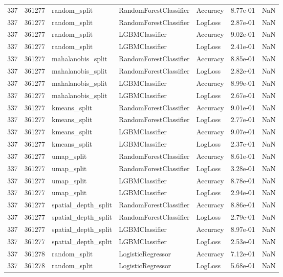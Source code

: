 \begin{tabular}{rrlllrr}
337 & 361277 & random\_split & RandomForestClassifier & Accuracy & 8.77e-01 & NaN \\
337 & 361277 & random\_split & RandomForestClassifier & LogLoss & 2.87e-01 & NaN \\
337 & 361277 & random\_split & LGBMClassifier & Accuracy & 9.02e-01 & NaN \\
337 & 361277 & random\_split & LGBMClassifier & LogLoss & 2.41e-01 & NaN \\
337 & 361277 & mahalanobis\_split & RandomForestClassifier & Accuracy & 8.85e-01 & NaN \\
337 & 361277 & mahalanobis\_split & RandomForestClassifier & LogLoss & 2.82e-01 & NaN \\
337 & 361277 & mahalanobis\_split & LGBMClassifier & Accuracy & 8.99e-01 & NaN \\
337 & 361277 & mahalanobis\_split & LGBMClassifier & LogLoss & 2.67e-01 & NaN \\
337 & 361277 & kmeans\_split & RandomForestClassifier & Accuracy & 9.01e-01 & NaN \\
337 & 361277 & kmeans\_split & RandomForestClassifier & LogLoss & 2.77e-01 & NaN \\
337 & 361277 & kmeans\_split & LGBMClassifier & Accuracy & 9.07e-01 & NaN \\
337 & 361277 & kmeans\_split & LGBMClassifier & LogLoss & 2.37e-01 & NaN \\
337 & 361277 & umap\_split & RandomForestClassifier & Accuracy & 8.61e-01 & NaN \\
337 & 361277 & umap\_split & RandomForestClassifier & LogLoss & 3.28e-01 & NaN \\
337 & 361277 & umap\_split & LGBMClassifier & Accuracy & 8.78e-01 & NaN \\
337 & 361277 & umap\_split & LGBMClassifier & LogLoss & 2.94e-01 & NaN \\
337 & 361277 & spatial\_depth\_split & RandomForestClassifier & Accuracy & 8.86e-01 & NaN \\
337 & 361277 & spatial\_depth\_split & RandomForestClassifier & LogLoss & 2.79e-01 & NaN \\
337 & 361277 & spatial\_depth\_split & LGBMClassifier & Accuracy & 8.97e-01 & NaN \\
337 & 361277 & spatial\_depth\_split & LGBMClassifier & LogLoss & 2.53e-01 & NaN \\
337 & 361278 & random\_split & LogisticRegressor & Accuracy & 7.12e-01 & NaN \\
337 & 361278 & random\_split & LogisticRegressor & LogLoss & 5.68e-01 & NaN \\

\end{tabular}
